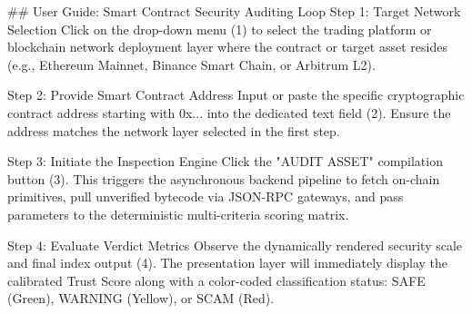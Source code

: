 ## User Guide: Smart Contract Security Auditing Loop
Step 1: Target Network Selection Click on the drop-down menu (1) to select the trading platform or blockchain network deployment layer where the contract or target asset resides (e.g., Ethereum Mainnet, Binance Smart Chain, or Arbitrum L2).

Step 2: Provide Smart Contract Address Input or paste the specific cryptographic contract address starting with 0x... into the dedicated text field (2). Ensure the address matches the network layer selected in the first step.

Step 3: Initiate the Inspection Engine Click the "AUDIT ASSET" compilation button (3). This triggers the asynchronous backend pipeline to fetch on-chain primitives, pull unverified bytecode via JSON-RPC gateways, and pass parameters to the deterministic multi-criteria scoring matrix.

Step 4: Evaluate Verdict Metrics Observe the dynamically rendered security scale and final index output (4). The presentation layer will immediately display the calibrated Trust Score along with a color-coded classification status: SAFE (Green), WARNING (Yellow), or SCAM (Red).

